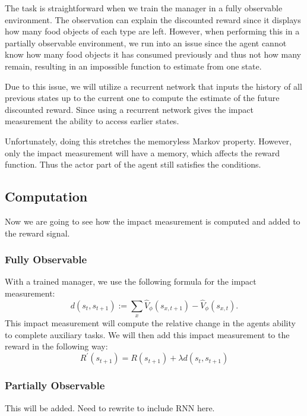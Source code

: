 \documentclass[12pt,A4]{report}
\theoremstyle{definition}
\begin{document}
The task is straightforward when we train the manager in a fully observable environment. The observation can explain the discounted reward since it displays how many food objects of each type are left. However, when performing this in a partially observable environment, we run into an issue since the agent cannot know how many food objects it has consumed previously and thus not how many remain, resulting in an impossible function to estimate from one state. 

Due to this issue, we will utilize a recurrent network that inputs the history of all previous states up to the current one to compute the estimate of the future discounted reward. Since using a recurrent network gives the impact measurement the ability to access earlier states. 

Unfortunately, doing this stretches the memoryless Markov property. However, only the impact measurement will have a memory, which affects the reward function. Thus the actor part of the agent still satisfies the conditions.


\subsection{Computation}
Now we are going to see how the impact measurement is computed and added to the reward signal. 

\subsubsection{Fully Observable}
With a trained manager, we use the following formula for the impact measurement:
\[ d(s_t,s_{t+1}) := \sum_x \hat{V}_\phi(s_{x,t+1}) - \hat{V}_\phi(s_{x,t}).\]
This impact measurement will compute the relative change in the agents ability to complete auxiliary tasks. We will then add this impact measurement to the reward in the following way: 
\[ R^{\prime}(s_{t+1}) = R(s_{t+1}) + \lambda d(s_t,s_{t+1})\]

\subsubsection{Partially Observable}
This will be added. Need to rewrite to include RNN here. 

\end{document}

